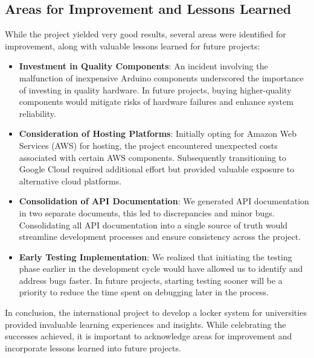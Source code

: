 \subsection{Areas for Improvement and Lessons Learned}

While the project yielded very good results, several areas were identified for improvement, along with valuable lessons learned for future projects:

\begin{itemize}
    \item \textbf{Investment in Quality Components}: An incident involving the malfunction of inexpensive Arduino components underscored the importance of investing in quality hardware. In future projects, buying higher-quality components would mitigate risks of hardware failures and enhance system reliability.

    \item \textbf{Consideration of Hosting Platforms}: Initially opting for Amazon Web Services (AWS) for hosting, the project encountered unexpected costs associated with certain AWS components. Subsequently transitioning to Google Cloud required additional effort but provided valuable exposure to alternative cloud platforms.

    \item \textbf{Consolidation of API Documentation}: We generated API documentation in two separate documents, this led to discrepancies and minor bugs. Consolidating all API documentation into a single source of truth would streamline development processes and ensure consistency across the project.

    \item \textbf{Early Testing Implementation}: We realized that initiating the testing phase earlier in the development cycle would have allowed us to identify and address bugs faster. In future projects, starting testing sooner will be a priority to reduce the time spent on debugging later in the process.
\end{itemize}

In conclusion, the international project to develop a locker system for universities provided invaluable learning experiences and insights. While celebrating the successes achieved, it is important to acknowledge areas for improvement and incorporate lessons learned into future projects.